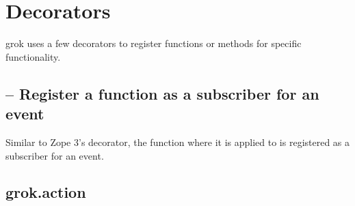 \chapter{Decorators}

grok uses a few decorators to register functions or methods for specific
functionality.

    \section{ -- Register a function as a subscriber
    for an event}

    Similar to Zope 3's  decorator, the
    function where it is applied to is registered as a subscriber for an event. 




    \section{grok.action}

